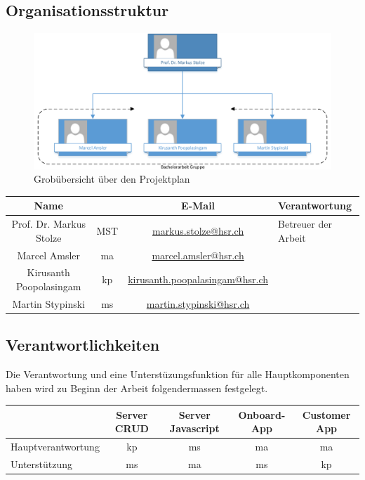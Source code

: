 \subsection{Organisationsstruktur}
\begin{figure}[ht]
	\centering
	\includegraphics[width=\textwidth]{images/organigram.pdf}
	\caption{Grobübersicht über den Projektplan}
	\label{Risk result}
\end{figure}
\noindent
\begin{tabularx}{\textwidth}{|c|c|c|X|}
  \hline
  \textbf{Name} & & \textbf{E-Mail} & \textbf{Verantwortung} \\
  \hline \hline
  Prof. Dr. Markus Stolze & MST & \url{markus.stolze@hsr.ch} & Betreuer der Arbeit\\
  \hline \hline
  Marcel Amsler & ma &\url{marcel.amsler@hsr.ch} & \\
  \hline
  Kirusanth Poopolasingam & kp & \url{kirusanth.poopalasingam@hsr.ch} & \\
  \hline
  Martin Stypinski & ms & \url{martin.stypinski@hsr.ch} & \\
  \hline
\end{tabularx}
\newpage

\subsection{Verantwortlichkeiten}
Die Verantwortung und eine Unterstüzungsfunktion für alle Hauptkomponenten haben wird zu Beginn der Arbeit folgendermassen festgelegt.\\

\begin{tabularx}{\textwidth}{|X|c|c|c|c|}
	\hline
	\textbf{} & \textbf{Server CRUD} & \textbf{Server Javascript} & \textbf{Onboard-App} & \textbf{Customer App} \\
	\hline 	\hline
	Hauptverantwortung & kp & ms & ma & ma\\
	\hline
	Unterstützung & ms & ma & ms & kp \\
	\hline
\end{tabularx}\\
\newpage


